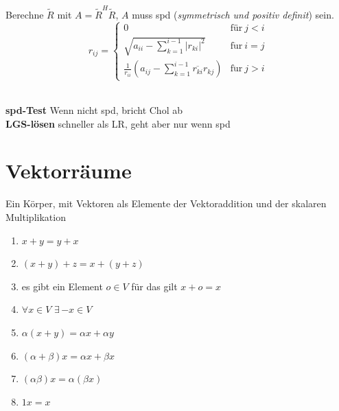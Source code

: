 \documentclass[a4paper,twocolumn]{article}
\begin{document}
		\begin{falgo}
			Berechne $\tilde R$ mit $A = \tilde R^H \tilde R$, $A$ muss spd (\textit{symmetrisch und positiv definit}) sein.
			$$r_{ij} = 
			\begin{cases}
			0 & \text{für}\ j < i\\
\sqrt{a_{ii} - \sum\limits_{k=1}^{i-1}|r_{ki}|^2 } & \mathrm{f\ddot{u}r}\ i = j\\
\frac{1}{r_{ii}} \left( a_{ij}-\sum\limits_{k=1}^{i-1}\overline{r_{ki}} r_{kj} \right) & \mathrm{f\ddot{u}r}\ j > i
\end{cases}$$\\[-6mm]
		\end{falgo}
			
		\begin{fmerke}[Anwendungen]
			\textbf{spd-Test} Wenn nicht spd, bricht Chol ab\\
			\textbf{LGS-lösen} schneller als LR, geht aber nur wenn spd
		\end{fmerke} 


\section{Vektorräume}

	\begin{fdef}[Vektorraum]
		Ein Körper, mit Vektoren als Elemente der Vektoraddition und der skalaren Multiplikation
	\end{fdef}
	
	\begin{feig}
		\renewcommand{\labelenumi}{(V\theenumi)}
		
		\begin{enumerate}
			\item $x + y = y + x$\\[-5.5mm]
			\item $(x + y) + z = x + (y + z)$\\[-5.5mm]
			\item es gibt ein Element $o \in V$ für das gilt $x + o = x$\\[-5.5mm]
			\item $\forall x \in V$  $\exists \, {-x} \in V$\\[-5.5mm]
			\item $\alpha(x + y) = \alpha{}x + \alpha{}y$\\[-5.5mm]
			\item $(\alpha + \beta)x = \alpha{}x + \beta{}x$\\[-5.5mm]
			\item $(\alpha{}\beta{})x = \alpha{}(\beta{}x)$\\[-5.5mm]
			\item $1x = x$
		\end{enumerate}
		\vspace{-2.5mm}
	\end{feig}
	
\end{document}
